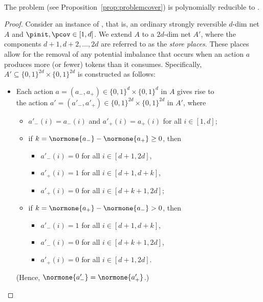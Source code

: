 \begin{prop}
\hfill\\
	The \Cover problem (see Proposition~\ref{prop:problemcover}) is polynomially reducible to \SCover.
\end{prop}
\begin{proof}
Consider an instance of \Cover, that is,
an ordinary strongly reversible $d$-dim net $A$ and
$\pinit,\pcov\in[1,d]$.
We extend $A$ to a $2d$-dim net $A'$, where the components $d+1, d+2, \dots, 2d$ are referred to as the \emph{store places}. These places allow for the removal of any potential imbalance that occurs when an action $a$ produces more (or fewer) tokens than it consumes. Specifically, $A' \subseteq \{0,1\}^{2d} \times \{0,1\}^{2d}$ is constructed as follows:
	\begin{itemize}
	\item		
Each action $a=(a_-,a_+)\in\{0,1\}^d\times\{0,1\}^d$ in $A$ gives rise 
 to 
\\
the action $a'=(a'_-,a'_+)\in\{0,1\}^{2d}\times\{0,1\}^{2d}$ in $A'$,
where
		\begin{itemize}
			\item
				$a'_-(i)=a_-(i)$ and $a'_+(i)=a_+(i)$
				for all $i\in[1,d]$;
\item
if $k=\normone{a_-} - \normone{a_+}\geq 0$, then
\begin{itemize}
			 \item
				 $a'_-(i)=0$ for all
				 $i\in[d+1,2d]$,
	\item				$a'_+(i)=1$ for all
				 $i\in[d+1,d+k]$,
 \item
		$a'_+(i)=0$ for all
				 $i\in[d+k+1,2d]$;
\end{itemize}
\item
if $k=\normone{a_+} - \normone{a_-}>0$, then
				\begin{itemize}
\item
			$a'_-(i)=1$ for all $i\in[d+1,d+k]$, 
		\item		 $a'_-(i)=0$ for all
				 $i\in[d+k+1,2d]$,
\item
	$a'_+(i)=0$ for all $i\in[d+1,2d]$.
				\end{itemize}
				\end{itemize}
		(Hence, $\normone{a'_-}=\normone{a'_+}$.)
	

\end{itemize}
\end{proof}

